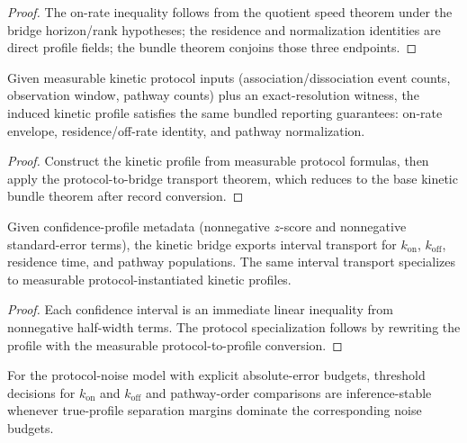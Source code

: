 \begin{proof}
The on-rate inequality follows from the quotient speed theorem under the bridge horizon/rank hypotheses; the residence and normalization identities are direct profile fields; the bundle theorem conjoins those three endpoints.
\end{proof}

\begin{theorem}\label{thm:kinetic-protocol-measurement-transport}
Given measurable kinetic protocol inputs (association/dissociation event counts, observation window, pathway counts) plus an exact-resolution witness, the induced kinetic profile satisfies the same bundled reporting guarantees: on-rate envelope, residence/off-rate identity, and pathway normalization.
\end{theorem}

\begin{proof}
Construct the kinetic profile from measurable protocol formulas, then apply the protocol-to-bridge transport theorem, which reduces to the base kinetic bundle theorem after record conversion.
\end{proof}

\begin{theorem}\label{thm:kinetic-confidence-transport}
Given confidence-profile metadata (nonnegative $z$-score and nonnegative standard-error terms), the kinetic bridge exports interval transport for $k_{\mathrm{on}}$, $k_{\mathrm{off}}$, residence time, and pathway populations. The same interval transport specializes to measurable protocol-instantiated kinetic profiles.
\end{theorem}

\begin{proof}
Each confidence interval is an immediate linear inequality from nonnegative half-width terms. The protocol specialization follows by rewriting the profile with the measurable protocol-to-profile conversion.
\end{proof}

\begin{theorem}\label{thm:kinetic-protocol-inference-guarantee}
For the protocol-noise model with explicit absolute-error budgets, threshold decisions for $k_{\mathrm{on}}$ and $k_{\mathrm{off}}$ and pathway-order comparisons are inference-stable whenever true-profile separation margins dominate the corresponding noise budgets.
\end{theorem}

